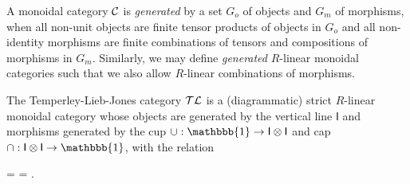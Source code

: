 \begin{definition}
    A monoidal category $\mathcal{C}$ is \textit{generated} by a set $G_o$ of objects and $G_m$ of morphisms, when all non-unit objects are finite tensor products of objects in $G_o$ and all non-identity morphisms are finite combinations of tensors and compositions of morphisms in $G_m$. Similarly, we may define \textit{generated} $R$-linear monoidal categories such that we also allow $R$-linear combinations of morphisms.
\end{definition}

\begin{example}
    \label{eg:tl-category}
    The Temperley-Lieb-Jones category $\mathcal{TL}$ is a (diagrammatic) strict $R$-linear monoidal category whose objects are generated by the vertical line $\mathsf{I}$ and morphisms generated by the cup $\cup: \mathbbb{1} \to \mathsf{I} \tensor \mathsf{I}$ and cap $\cap: \mathsf{I} \tensor \mathsf{I} \to \mathbbb{1}$, with the relation
    \begin{center}
        = 
        = .
    \end{center}





\end{example}


















